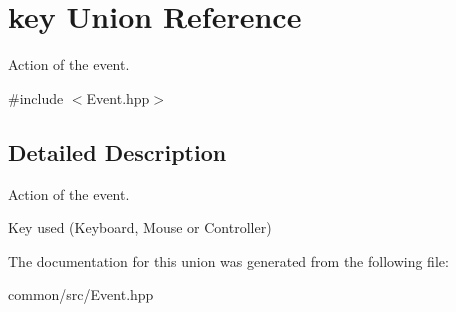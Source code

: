 \hypertarget{unionkey}{}\section{key Union Reference}
\label{unionkey}


Action of the event.  




{\ttfamily \#include $<$Event.\+hpp$>$}



\subsection{Detailed Description}
Action of the event. 

Key used (Keyboard, Mouse or Controller) 

The documentation for this union was generated from the following file\+:\begin{DoxyCompactItemize}
\item 
common/src/Event.\+hpp\end{DoxyCompactItemize}
